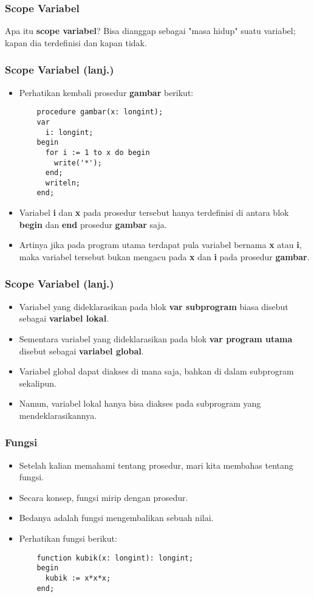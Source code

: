 \begin{frame}[fragile]
\frametitle{Scope Variabel}
\begin{block}{Apa itu \textbf{scope variabel}?}
Bisa dianggap sebagai "masa hidup" suatu variabel; kapan dia terdefinisi dan kapan tidak.
\end{block}
\end{frame}

\begin{frame}[fragile]
\frametitle{Scope Variabel (lanj.)}
\begin{itemize}
  \item Perhatikan kembali prosedur \textbf{gambar} berikut:
  \begin{lstlisting}
    procedure gambar(x: longint);
    var
      i: longint;
    begin
      for i := 1 to x do begin
        write('*');
      end;
      writeln;
    end;
  \end{lstlisting}
  \item Variabel \textbf{i} dan \textbf{x} pada prosedur tersebut hanya terdefinisi di antara blok \textbf{begin} dan \textbf{end} prosedur \textbf{gambar} saja.
  \item Artinya jika pada program utama terdapat pula variabel bernama \textbf{x} atau \textbf{i}, maka variabel tersebut \alert{bukan} mengacu pada \textbf{x} dan \textbf{i} pada prosedur \textbf{gambar}.
\end{itemize}
\end{frame}

\begin{frame}[fragile]
\frametitle{Scope Variabel (lanj.)}
\begin{itemize}
  \item Variabel yang dideklarasikan pada blok \textbf{var subprogram} biasa disebut sebagai \textbf{variabel lokal}.
  \item Sementara variabel yang dideklarasikan pada blok \textbf{var program utama} disebut sebagai \textbf{variabel global}.
  \item Variabel global dapat diakses di mana saja, bahkan di dalam subprogram sekalipun.
  \item Namun, variabel lokal hanya bisa diakses pada subprogram yang mendeklarasikannya.
\end{itemize}
\end{frame}

\begin{frame}[fragile]
\frametitle{Fungsi}
\begin{itemize}
  \item Setelah kalian memahami tentang prosedur, mari kita membahas tentang fungsi.
  \item Secara konsep, fungsi mirip dengan prosedur.
  \item Bedanya adalah fungsi \alert{mengembalikan sebuah nilai}.
  \item Perhatikan fungsi berikut:
  \begin{lstlisting}
    function kubik(x: longint): longint;
    begin
      kubik := x*x*x;
    end;
  \end{lstlisting}
\end{itemize}
\end{frame}

